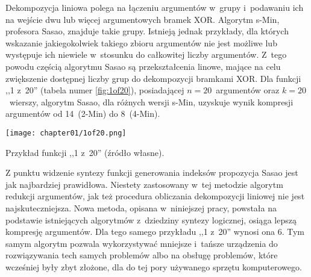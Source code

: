 Dekompozycja liniowa polega na łączeniu argumentów w~grupy i~podawaniu ich na wejście dwu lub więcej argumentowych bramek XOR.
Algorytm s-Min, profesora Sasao, znajduje takie grupy.
Istnieją jednak przykłady,
dla których wskazanie jakiegokolwiek takiego zbioru argumentów nie jest możliwe lub występuje ich niewiele w~stosunku do całkowitej liczby argumentów.
Z~tego powodu częścią algorytmu Sasao są przekształcenia linowe,
mające na celu zwiększenie dostępnej liczby grup do dekompozycji bramkami XOR.
Dla funkcji ,,1 z~20'' (tabela numer \ref{fig:1of20}),
posiadającej $n=20$~argumentów oraz $k=20$~wierszy,
algorytm Sasao,
dla różnych wersji s-Min,
uzyskuje wynik kompresji argumentów od 14~(2-Min) do 8~(4-Min).

\begin{table}
\centering
\texttt{[image: chapter01/1of20.png]}
\caption{Przykład funkcji ,,1 z~20'' (źródło własne).}
\label{fig:1of20}
\end{table}

Z punktu widzenie syntezy funkcji generowania indeksów propozycja Sasao jest jak najbardziej prawidłowa.
Niestety zastosowany w~tej metodzie algorytm redukcji argumentów,
jak też procedura obliczania dekompozycji liniowej nie jest najskuteczniejsza.
Nowa metoda,
opisana w~niniejszej pracy,
powstała na podstawie istniejących algorytmów z~dziedziny syntezy logicznej,
osiąga lepszą kompresję argumentów.
Dla tego samego przykładu ,,1 z~20'' wynosi ona 6.
Tym samym algorytm pozwala wykorzystywać mniejsze i~tańsze urządzenia do rozwiązywania tech samych problemów
albo na obsługę problemów, które wcześniej były zbyt złożone,
dla do tej pory używanego sprzętu komputerowego.



